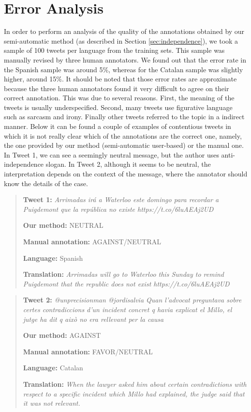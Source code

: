 \documentclass[10pt, a4paper]{article}
\begin{document}
\section{Error Analysis}\label{sec:error}

In order to perform an analysis of the quality of the annotations obtained by our semi-automatic method (as described in Section \ref{sec:independence}), we took a sample of 100 tweets per language from the training sets. This sample was manually revised by three human annotators. We found out that the error rate in the Spanish sample was around 5\%, whereas for the Catalan sample was slightly higher, around 15\%. It should be noted that those error rates are approximate because the three human annotators found it very difficult to agree on their correct annotation. This was due to several reasons. First, the meaning of the tweets is usually underspecified. Second, many tweets use figurative language such as sarcasm and irony. Finally other tweets referred to the topic in a indirect manner. Below it can be found a couple of examples of contentious tweets in which it is not really clear which of the annotations are the correct one, namely, the one provided by our method (semi-automatic user-based) or the manual one. In Tweet 1, we can see a seemingly neutral message, but the author uses anti-independence slogan. In Tweet 2, although it seems to be neutral, the interpretation depends on the context of the message, where the annotator should know the details of the case.

\begin{quote}
\textbf{Tweet 1:} \emph{Arrimadas ir\'a a Waterloo este domingo para recordar a Puigdemont que  la rep\'ublica no existe  https://t.co/6luAEAj2UD}

\textbf{Our method:} NEUTRAL

\textbf{Manual annotation:} AGAINST/NEUTRAL

\textbf{Language:} Spanish

\textbf{Translation:} \emph{Arrimadas will go to Waterloo this Sunday to remind Puigdemont that the republic does not exist https://t.co/6luAEAj2UD}
\end{quote}


\begin{quote}
\textbf{Tweet 2:} \emph{@unprecisionman @jordisalvia Quan l'advocat preguntava sobre certes contradiccions d'un incident concret q havia explicat el Millo, el jutge ha dit q aix\`o no era rellevant per la causa}

\textbf{Our method:} AGAINST

\textbf{Manual annotation:} FAVOR/NEUTRAL

\textbf{Language:} Catalan

\textbf{Translation:} \emph{When the lawyer asked him about certain contradictions with respect to a specific incident which Millo had explained, the judge said that it was not relevant.}

\end{quote}
\end{document}
